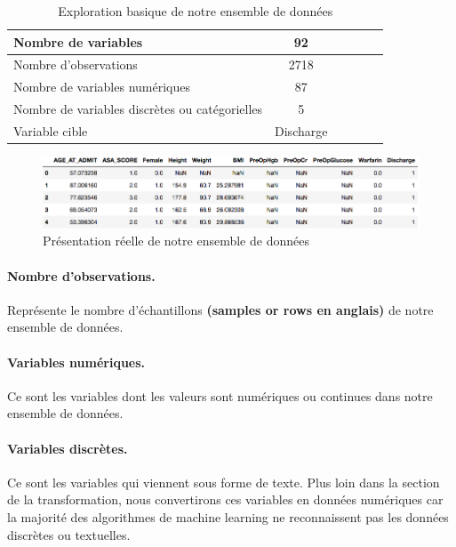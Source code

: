 \documentclass[12pt, french]{report}
\begin{document}
\begin{table}[h]
\centering
\begin{tabular}{|l|c|c|c|c|c|}
\hline
Nombre de variables & 92 \\
\hline
Nombre d'observations & 2718\\
\hline
Nombre de variables numériques & 87\\
\hline
Nombre de variables discrètes ou catégorielles & 5\\
\hline
Variable cible & Discharge\\
\hline

\end{tabular}
\caption{Exploration basique de notre ensemble de données}
\label{tab:dataset}
\end{table}

\begin{figure}[h]
\includegraphics[width=18cm]{images/examplesfeatures.png}
\caption{Présentation réelle de notre ensemble de données}
\label{fig:samplesdataset}
\end{figure}


\paragraph*{Nombre d'observations.} Représente le nombre d'échantillons \textbf{(samples or rows en anglais)} de notre ensemble de données. 

\paragraph*{ Variables numériques.} Ce sont les variables dont les valeurs sont numériques ou continues dans notre ensemble de données.

\paragraph*{ Variables discrètes.} Ce sont les variables qui viennent sous forme de texte. Plus loin dans la section de la transformation, nous convertirons ces variables en données numériques car la majorité des algorithmes de machine learning ne reconnaissent pas les données discrètes ou textuelles.
\end{document}
